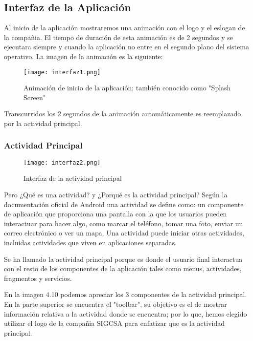 \subsection{Interfaz de la Aplicación}

\par
Al inicio de la aplicación mostraremos una animación con el logo y el eslogan de la compañia. El tiempo de duración de esta animación es de 2 segundos y se ejecutara siempre y cuando la aplicación no entre en el segundo plano del sistema operativo. La imagen de la animación es la siguiente:

\begin{figure}[H]
	\centering
	\texttt{[image: interfaz1.png]}
	\caption{Animación de inicio de la aplicación; también conocido como "Splash Screen"}
\end{figure}

\par \noindent
Transcurridos los 2 segundos de la animación automáticamente es reemplazado por la actividad principal.  

\subsubsection{Actividad Principal}

\begin{figure}[H]
	\centering
	\texttt{[image: interfaz2.png]}
	\caption{Interfaz de la actividad principal}
\end{figure}

\par 
Pero ¿Qué es una actividad? y ¿Porqué es la actividad principal? Según la documentación oficial de Android una actividad se define como: un componente de aplicación que proporciona una pantalla con la que los usuarios pueden interactuar para hacer algo, como marcar el teléfono, tomar una foto, enviar un correo electrónico o ver un mapa. Una actividad puede iniciar otras actividades, incluidas actividades que viven en aplicaciones separadas.\cite{androidapp}

\par \noindent
Se ha llamado la actividad principal porque es donde el usuario final interactua con el resto de los componentes de la aplicación tales como menus, actividades, fragmentos y servicios. 

\par \noindent
En la imagen 4.10 podemos apreciar los 3 componentes de la actividad principal. En la parte superior se encuentra el "toolbar", su objetivo es el de mostrar información relativa a la actividad donde se encuentra; por lo que, hemos elegido utilizar el logo de la compañia SIGCSA para enfatizar que es la actividad principal. 

